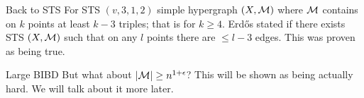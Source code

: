 \begin{topic}{Back to STS}
	For STS $(v,3,1,2)$ simple hypergraph $(X, \mathcal{M})$ where $\mathcal{M}$ contains on $k$ points at least $k-3$ triples; that is for $k \geq 4$. Erd\H os stated if there exists STS $(X, \mathcal{M})$ such that on any $l$ points there are $\leq l-3$ edges. This was proven as being true.
\end{topic}

\begin{topic}{Large BIBD}
	But what about $|\mathcal{M}| \geq n^{1 + \epsilon}$? This will be shown as being actually hard. We will talk about it more later.
\end{topic}